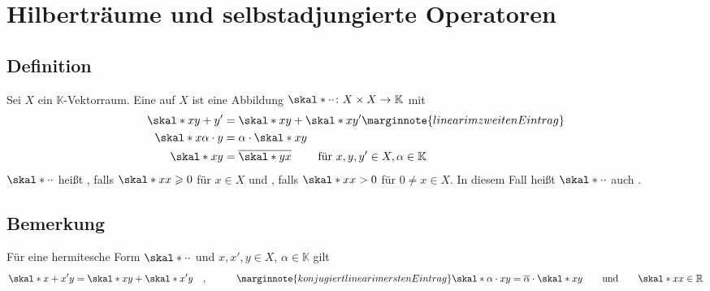 \newpage
\section{Hilberträume und selbstadjungierte Operatoren} %
\label{sec:7}

\subsection[Definition: Hermitesche Form, Skalarprodukt]{Definition} %
\label{sub:71}
Sei $X$ ein $\mathds{K}$-Vektorraum. Eine  auf $X$ ist eine Abbildung $\skal*{\cdot}{\cdot} \colon X \times X \to \mathds{K}$ mit
\begin{align*}
	\skal*{x}{y+y'} &= \skal*{x}{y} + \skal*{x}{y'} \marginnote{linear im zweiten Eintrag}\\
	\skal*{x}{\alpha \cdot y} &= \alpha \cdot \skal*{x}{y} \\
	\skal*{x}{y} &= \overline{\skal*{y}{x}} \qquad \text{ für } x,y,y' \in X, \alpha \in \mathds{K}       
\end{align*}
$\skal*{\cdot}{\cdot } $ heißt , falls $\skal*{x}{x}\ge 0$ für $x \in X$ und 
, falls 
$\skal*{x}{x} >0$ für $0 \not= x \in X$. In diesem Fall heißt $\skal*{\cdot }{\cdot }$ auch .  

\subsection[Bemerkung: Einfache Eigenschaften von hermiteschen Formen]{Bemerkung} %
\label{sub:72}
Für eine hermitesche Form $\skal*{\cdot}{\cdot}$ und $x,x',y \in X$, $\alpha \in \mathds{K}$ gilt 
\begin{align*}
	\skal*{x+x'}{y} = \skal*{x}{y} + \skal*{x'}{y} \quad , \quad \qquad \marginnote{konjugiert linear im ersten Eintrag}
	\skal*{\alpha \cdot x}{y} = \overline{\alpha} \cdot \skal*{x}{y} \qquad \text{und} \qquad 
	\skal*{x}{x} \in \mathds{R} 
\end{align*}

